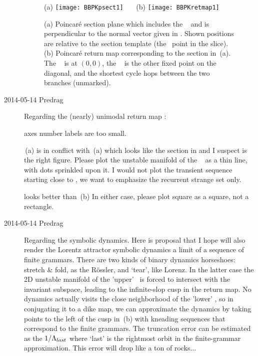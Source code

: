 \begin{description}
\begin{figure}%
  \begin{center}
   (a) \texttt{[image: BBPKpsect1]}
~~~(b) \texttt{[image: BBPKretmap1]}
  \end{center}
  \caption{
(a) Poincar\'e section plane which includes the \reqv\   and
	is perpendicular to the normal vector given in .
	Shown positions are relative to the section template
   (the \reqv\ point in the slice).
(b) 	Poincar\'e return map corresponding to the section in
    \,(a). The \eqv\  is at $(0,0)$, the
    \reqv\  is the other fixed point on the diagonal, and the
    shortest cycle  hops between the two branches (unmarked).
    }
  \label{fig:BBPKpsect1}
\end{figure}


\item[2014-05-14 Predrag] Regarding the (nearly)
unimodal return map :

 axes number labels are too small.

\,(a) is in conflict with
\,(a) which looks like the section in
 and I suspect is the right figure. Please plot the
unstable manifold of the \reqv\   as a thin line, with
dots sprinkled upon it. I would not plot the transient sequence starting
close to , we want to emphasize the recurrent strange set
only.

 looks better than
\,(b) In either case, please plot square as a
square, not a rectangle.

\item[2014-05-14 Predrag] Regarding the symbolic dynamics. Here is
proposal that I hope will also render the Lorentz attractor symbolic
dynamics a limit of a sequence of finite grammars. There are two kinds of
binary dynamics horseshoes: stretch \& fold, as the R\"ossler, and
`tear', like Lorenz. In the latter case the 2D unstable manifold of the
'upper' \eqv\ is forced to intersect with the invariant subspace, leading
to the infinite-slop cusp in the return map. No dynamics actually visits
the close neighborhood of the 'lower' \eqv, so in conjugating it to a
dike map, we can approximate the dynamics by taking points to the left of
the cusp in \,(b) with kneading sequences that
correspond to the finite grammars. The truncation error can be estimated
as the $1/\Lambda_{last}$ where `last' is the rightmost orbit in the
finite-grammar approximation. This error will drop like a ton of rocks...


\end{description}
